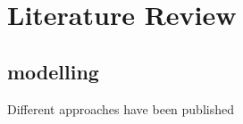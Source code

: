 \chapter{Literature Review} \label{ch:Literature_Review}

\section{modelling}
Different approaches have been published 